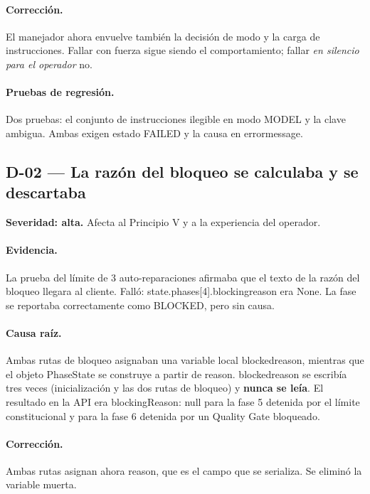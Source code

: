 \documentclass[11pt,a4paper]{article}
\newcommand{\code}[1]{{\ttfamily\small\def\_{\textunderscore\allowbreak}#1}}
\begin{document}
\paragraph{Corrección.} El manejador ahora envuelve también la decisión de modo y la carga de
instrucciones. Fallar con fuerza sigue siendo el comportamiento; fallar \emph{en silencio
para el operador} no.

\paragraph{Pruebas de regresión.} Dos pruebas: el conjunto de instrucciones ilegible en modo
MODEL y la clave ambigua. Ambas exigen estado \code{FAILED} y la causa en
\code{error\_message}.

\subsection*{D-02 --- La razón del bloqueo se calculaba y se descartaba}

\begin{finding}
\textbf{Severidad: alta.} Afecta al Principio V y a la experiencia del operador.
\end{finding}

\paragraph{Evidencia.} La prueba del límite de 3 auto-reparaciones afirmaba que el texto de
la razón del bloqueo llegara al cliente. Falló: \code{state.phases[4].blocking\_reason} era
\code{None}. La fase se reportaba correctamente como \code{BLOCKED}, pero sin causa.

\paragraph{Causa raíz.} Ambas rutas de bloqueo asignaban una variable local
\code{blocked\_reason}, mientras que el objeto \code{PhaseState} se construye a partir de
\code{reason}. \code{blocked\_reason} se escribía tres veces (inicialización y las dos rutas
de bloqueo) y \textbf{nunca se leía}. El resultado en la API era
\code{blockingReason: null} para la fase 5 detenida por el límite constitucional y para la
fase 6 detenida por un Quality Gate bloqueado.

\paragraph{Corrección.} Ambas rutas asignan ahora \code{reason}, que es el campo que se
serializa. Se eliminó la variable muerta.
\end{document}
